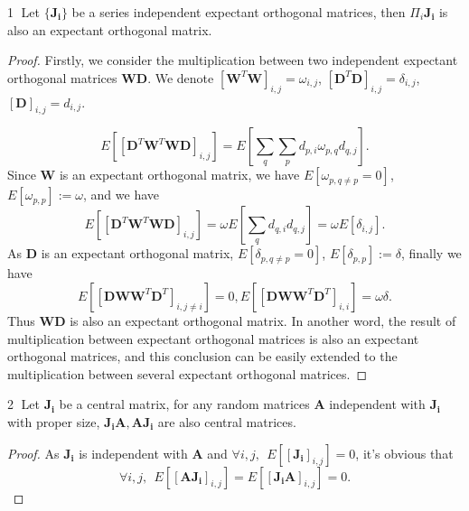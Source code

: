 \documentclass[10pt,journal,compsoc]{IEEEtran}
\begin{document}
\textcircled{1} Let $\{\mathbf{J_i}\}$ be a series independent expectant orthogonal matrices, then $\Pi_i\mathbf{J_i}$ is also an expectant orthogonal matrix.

\begin{proof}
Firstly, we consider the multiplication between two independent expectant orthogonal matrices $\mathbf{W}\mathbf{D}$. We denote $[\mathbf{W}^T\mathbf{W}]_{i,j}=\omega_{i,j}$, $[\mathbf{D}^T\mathbf{D}]_{i,j}=\delta_{i,j}$, $[\mathbf{D}]_{i,j}=d_{i,j}$.

\begin{equation}
    E\left[\left[\mathbf{D}^T\mathbf{W}^T\mathbf{WD}\right]_{i,j}\right]=E\left[\sum_q\sum_pd_{p,i}\omega_{p,q}d_{q,j}\right].
\end{equation}
Since $\mathbf{W}$ is an expectant orthogonal matrix, we have $E[\omega_{p,q\neq p}=0]$, $E[\omega_{p,p}]:=\omega$, and we have
\begin{equation}
    E\left[\left[\mathbf{D}^T\mathbf{W}^T\mathbf{WD}\right]_{i,j}\right]=\omega E\left[\sum_qd_{q,i}d_{q,j}\right] = \omega E[\delta_{i,j}].
\end{equation}
As $\mathbf{D}$ is an expectant orthogonal matrix, $E[\delta_{p,q\neq p}=0]$, $E[\delta_{p,p}]:=\delta$, finally we have
\begin{equation}
    E\left[\left[\mathbf{DWW}^T\mathbf{D}^T\right]_{i,j\neq i}\right]=0,E\left[\left[\mathbf{DWW}^T\mathbf{D}^T\right]_{i,i}\right]=\omega\delta.
\end{equation}
Thus $\mathbf{WD}$ is also an expectant orthogonal matrix. In another word, the result of multiplication between expectant orthogonal matrices is also an expectant orthogonal matrices, and this conclusion can be easily extended to the multiplication between several expectant orthogonal matrices.
\end{proof}

\textcircled{2} Let $\mathbf{J_i}$ be a central matrix, for any random matrices $\mathbf{A}$ independent with $\mathbf{J_i}$ with proper size, $\mathbf{J_iA},\mathbf{AJ_i}$ are also central matrices.
\begin{proof}
As $\mathbf{J_i}$ is independent with $\mathbf{A}$ and $\forall i,j,~~E\left[\left[\mathbf{J_i}\right]_{i,j}\right]=0$, it's obvious that 
\begin{equation}
    \forall i,j,~~E\left[\left[\mathbf{AJ_i}\right]_{i,j}\right]= E\left[\left[\mathbf{J_iA}\right]_{i,j}\right]=0.
\end{equation}
\end{proof}
\end{document}
